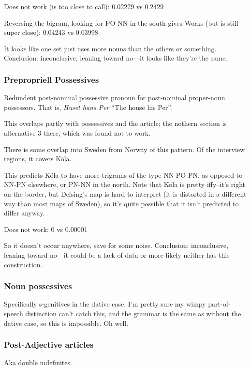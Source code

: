 Does not work (is too close to call): 0.02229 vs 0.2429

Reversing the bigram, looking for PO-NN in the south gives
Works (but is still super close): 0.04243 vs 0.03998

It looks like one set just uses more nouns than the others or
something. Conclusion: inconclusive, leaning toward no---it looks like
they're the same.

\subsubsection{Prepropriell Possessives}

Redundent post-nominal possessive pronoun for post-nominal proper-noun
possessors. That is, {\it Huset hans Per} ``The house his Per''.

This overlaps partly with possessives and the article; the nothern
section is alternative 3 there, which was found not to work.

There is some overlap into Sweden from Norway of this pattern. Of the
interview regions, it covers K\"ola.

This predicts K\"ola to have more trigrams of the type NN-PO-PN, as
opposed to NN-PN elsewhere, or PN-NN in the north. Note that K\"ola is
pretty iffy--it's right on the border, but Delsing's map is hard to
interpret (it is distorted in a different way than most maps of
Sweden), so it's quite possible that it isn't predicted to differ anyway.

Does not work: 0 vs 0.00001

So it doesn't occur anywhere, save for some noise. Conclusion:
inconclusive, leaning toward no---it could be a lack of data or more
likely neither has this construction.

\subsubsection{Noun possessives}

Specifically s-genitives in the dative case. I'm pretty sure my wimpy
part-of-speech distinction can't catch this, and the grammar is the
same as without the dative case, so this is impossible. Oh well.

\subsubsection{Post-Adjective articles}

Aka double indefinites.

